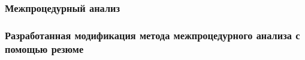 \documentclass[hyperref={pdfpagelabels=false},10pt,gray]{beamer}
\begin{document}

\begin{frame}
\frametitle{Межпроцедурный анализ}
\begin{figure}[h]
\end{figure}
\end{frame}

\begin{frame}
\frametitle{Разработанная модификация метода межпроцедурного анализа с помощью резюме}
\begin{figure}[h]
\end{figure}
\end{frame}
\end{document}
